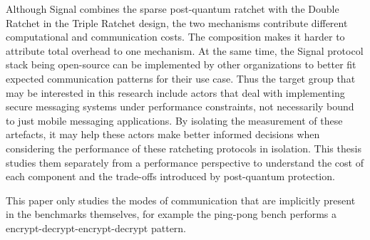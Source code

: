 Although Signal combines the sparse post-quantum ratchet with the Double Ratchet in the Triple Ratchet design, the two mechanisms contribute different computational and communication costs. The composition makes it harder to attribute total overhead to one mechanism. At the same time, the Signal protocol stack being open-source can be implemented by other organizations to better fit expected communication patterns for their use case. Thus the target group that may be interested in this research include actors that deal with implementing secure messaging systems under performance constraints, not necessarily bound to just mobile messaging applications. By isolating the measurement of these artefacts, it may help these actors make better informed decisions when considering the performance of these ratcheting protocols in isolation. This thesis studies them separately from a performance perspective to understand the cost of each component and the trade-offs introduced by post-quantum protection. 

 

This paper only studies the modes of communication that are implicitly present in the benchmarks themselves, for example the ping-pong bench performs a encrypt-decrypt-encrypt-decrypt pattern. 
